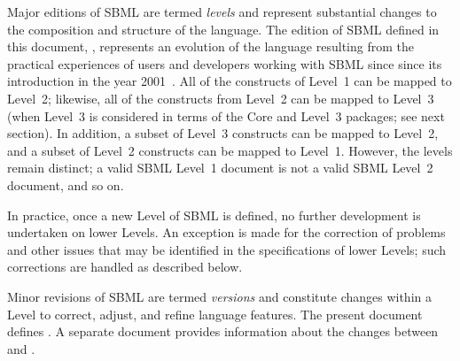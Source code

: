 Major editions of SBML are termed \emph{levels} and represent
substantial changes to the composition and structure of the
language.  The edition of SBML defined in this document,
\sbmlthree, represents an evolution of the language resulting from
the practical experiences of users and developers working with
SBML since since its introduction in the year
2001~\citep{hucka:2001,hucka:2003}.  All of the constructs of
Level~1 can be mapped to Level~2; likewise, all of the constructs
from Level~2 can be mapped to Level~3 (when Level~3 is considered
in terms of the Core and Level~3 packages; see next section).  In
addition, a subset of Level~3 constructs can be mapped to Level~2,
and a subset of Level~2 constructs can be mapped to Level~1.
However, the levels remain distinct; a valid SBML Level~1 document
is not a valid SBML Level~2 document, and so on.

In practice, once a new Level of SBML is defined, no further
development is undertaken on lower Levels.  An exception is made
for the correction of problems and other issues that may be
identified in the specifications of lower Levels; such corrections
are handled as described below.

Minor revisions of SBML are termed \emph{versions} and constitute
changes within a Level to correct, adjust, and refine language
features.  The present document defines \thisLV.  A separate
document provides information about the changes between \sbmlthree
and \sbmltwo.



